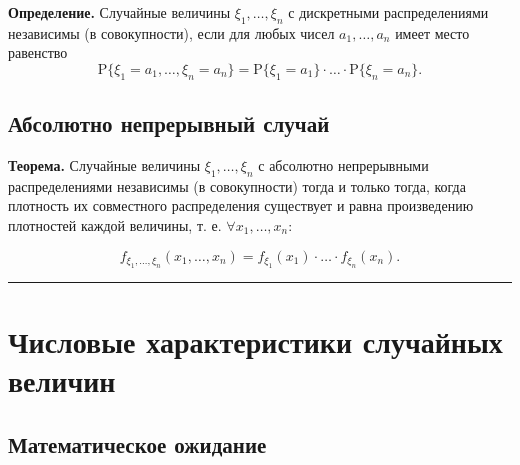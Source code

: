 \documentclass[11pt,a4paper]{article}
\begin{document}
\textbf{Определение.} Случайные величины \(\xi_1, \dots, \xi_n\) с
дискретными распределениями независимы (в совокупности), если для любых
чисел \(a_1, \dots , a_n\) имеет место равенство
\[ \mathrm{P}\{\xi_1=a_1, \dots, \xi_n=a_n\} = \mathrm{P}\{\xi_1=a_1\} \cdot \ldots \cdot \mathrm{P}\{\xi_n=a_n\}.\]

    \hypertarget{ux430ux431ux441ux43eux43bux44eux442ux43dux43e-ux43dux435ux43fux440ux435ux440ux44bux432ux43dux44bux439-ux441ux43bux443ux447ux430ux439}{%
\subsection{Абсолютно непрерывный
случай}\label{ux430ux431ux441ux43eux43bux44eux442ux43dux43e-ux43dux435ux43fux440ux435ux440ux44bux432ux43dux44bux439-ux441ux43bux443ux447ux430ux439}}

\textbf{Теорема.} Случайные величины \(\xi_1, \dots, \xi_n\) с абсолютно
непрерывными распределениями независимы (в совокупности) тогда и только
тогда, когда плотность их совместного распределения существует и равна
произведению плотностей каждой величины, т. е.
\(\forall x_1, \dots , x_n\):

\[ f_{\xi_1, \dots, \xi_n}(x_1, \dots, x_n) = f_{\xi_1}(x_1) \cdot \ldots \cdot f_{\xi_n}(x_n). \]

    \begin{center}\rule{0.5\linewidth}{0.5pt}\end{center}

    \hypertarget{ux447ux438ux441ux43bux43eux432ux44bux435-ux445ux430ux440ux430ux43aux442ux435ux440ux438ux441ux442ux438ux43aux438-ux441ux43bux443ux447ux430ux439ux43dux44bux445-ux432ux435ux43bux438ux447ux438ux43d}{%
\section{Числовые характеристики случайных
величин}\label{ux447ux438ux441ux43bux43eux432ux44bux435-ux445ux430ux440ux430ux43aux442ux435ux440ux438ux441ux442ux438ux43aux438-ux441ux43bux443ux447ux430ux439ux43dux44bux445-ux432ux435ux43bux438ux447ux438ux43d}}

\hypertarget{ux43cux430ux442ux435ux43cux430ux442ux438ux447ux435ux441ux43aux43eux435-ux43eux436ux438ux434ux430ux43dux438ux435}{%
\subsection{Математическое
ожидание}\label{ux43cux430ux442ux435ux43cux430ux442ux438ux447ux435ux441ux43aux43eux435-ux43eux436ux438ux434ux430ux43dux438ux435}}
\end{document}
